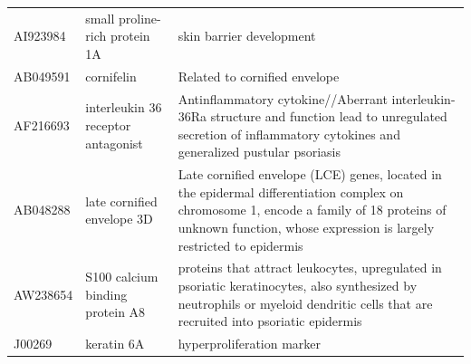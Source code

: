 \documentclass[10pt,a4paper]{article}
\begin{document}
\begin{table}[]
\begin{tabular}{l|p{4.5cm} p{8.5cm}}
		AI923984           & small proline-rich protein 1A                                                                                           & skin barrier development\cite{bergboer2012genetics}                                                                                                                                                                                                                  \\
		AB049591           & cornifelin                                                                                                              & Related to cornified envelope\cite{michibata2004identification}                                                                                                                                                                                                             \\
		AF216693           & interleukin 36 receptor antagonist                                                                                      & Antinflammatory cytokine//Aberrant interleukin-36Ra structure and function lead to unregulated secretion of inflammatory cytokines and generalized pustular psoriasis\cite{marrakchi2011interleukin}                                                                     \\
		AB048288           & late cornified envelope 3D                                                                                              & Late cornified envelope (LCE) genes, located in the epidermal differentiation complex on chromosome 1, encode a family of 18 proteins of unknown function, whose expression is largely restricted to epidermis\cite{niehues2017psoriasis}                             \\
		AW238654           & S100 calcium binding protein A8                                                                                         & proteins that attract leukocytes, upregulated in psoriatic keratinocytes, also synthesized by neutrophils or myeloid dendritic cells that are recruited into psoriatic epidermis\cite{roberson2010psoriasis}                                                           \\
		J00269             & keratin 6A                                                                                                              & hyperproliferation marker\cite{jiang2015biomarkers}                                                                                                                                                                                                                 \\

\end{tabular}
\end{table}
\end{document}
